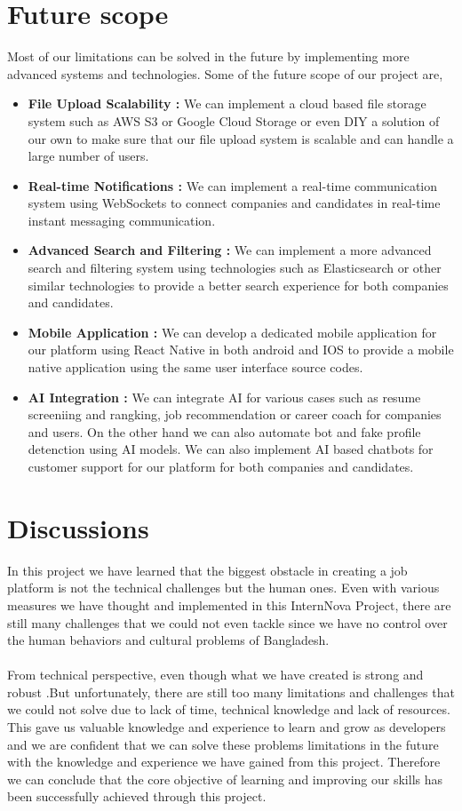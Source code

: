 \documentclass[a4paper, 14pt, openany]{extreport}
\begin{document}
	\section{Future scope}
	Most of our limitations can be solved in the future by implementing more advanced systems and technologies. Some of the future scope of our project are,
	\begin{itemize}
		\item \textbf{File Upload Scalability :} We can implement a cloud based file storage system such as AWS S3 or Google Cloud Storage or even DIY a solution of our own to make sure that our file upload system is scalable and can handle a large number of users.
		\item \textbf{Real-time Notifications :} We can implement a real-time communication system using WebSockets to connect companies and candidates in real-time instant messaging communication.
		\item \textbf{Advanced Search and Filtering :} We can implement a more advanced search and filtering system using technologies such as Elasticsearch or other similar technologies to provide a better search experience for both companies and candidates.
		\item \textbf{Mobile Application :} We can develop a dedicated mobile application for our platform using React Native in both android and IOS to provide a mobile native application using the same user interface source codes.
		\item \textbf{AI Integration :} We can integrate AI for various cases such as resume screeniing and rangking, job recommendation or career coach for companies and users. On the  other hand we can also automate bot and fake profile detenction using AI models. We can also implement AI based chatbots for customer support for our platform for both companies and candidates.
	\end{itemize}

	\section{Discussions}
	In this project we have learned that the biggest obstacle in creating a job platform is not the technical challenges but the human ones. Even with various measures we have thought and implemented in this InternNova Project, there are still many challenges that we could not even tackle since we have no control over the human behaviors and cultural problems of Bangladesh.
\\
\\
	From technical perspective, even though what we have created is strong and robust .But unfortunately, there are still too many limitations and challenges that we could not solve due to lack of time, technical knowledge and lack of resources. This gave us valuable knowledge and experience to learn and grow as developers and we are confident that we can solve these problems limitations in the future with the knowledge and experience we have gained from this project. Therefore we can conclude that the core objective of learning and improving our skills has been successfully achieved through this project.
\end{document}
